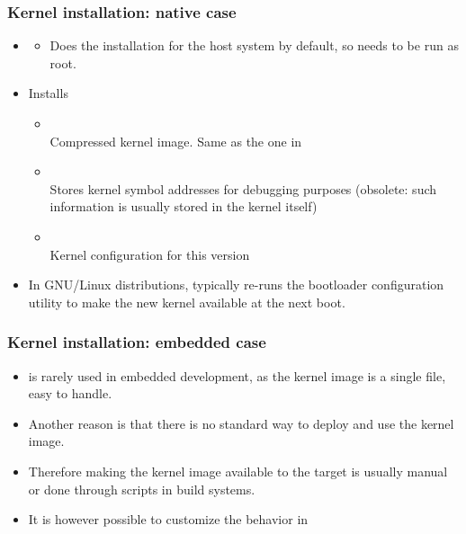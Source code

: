 \begin{frame}
  \frametitle{Kernel installation: native case}
  \begin{itemize}
  \item {}
    \begin{itemize}
    \item Does the installation for the host system by default, so
      needs to be run as root.
    \end{itemize}
  \item Installs
    \begin{itemize}
    \item {} \\
      Compressed kernel image. Same as the one in
    \item {}\\
      Stores kernel symbol addresses for debugging purposes
      (obsolete: such information is usually stored in the kernel itself)
    \item {}\\
      Kernel configuration for this version
    \end{itemize}
  \item In GNU/Linux distributions, typically re-runs the bootloader configuration
    utility to make the new kernel available at the next boot.
  \end{itemize}
\end{frame}

\begin{frame}
  \frametitle{Kernel installation: embedded case}
  \begin{itemize}
  \item {} is rarely used in embedded development, as the
    kernel image is a single file, easy to handle.
  \item Another reason is that there is no standard way to deploy and
    use the kernel image.
  \item Therefore making the kernel image available to the target is
    usually manual or done through scripts in build systems.
  \item It is however possible to customize the 
    behavior in 
  \end{itemize}
\end{frame}

